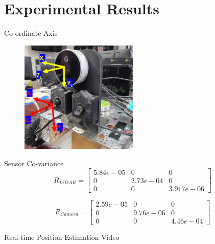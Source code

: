 \documentclass[10pt]{beamer}
\begin{document}


\section{Experimental Results}

\begin{frame}{Co-ordinate Axis}
\begin{figure}
    \centering
    \includegraphics[width=0.5\textwidth]{Images/experimentalplateform.png}
\end{figure}
\end{frame}

\begin{frame}{Sensor Co-variance}
\large
\centering
$$R_{LiDAR} = 
    \left[\begin{array}{ccc}
    5.84e-05 & 0 & 0 \\
    0 & 2.73e-04 & 0 \\
    0 & 0 & 3.917e-06
    \end{array}\right]$$
    
$$  R_{Camera} =
    \left[\begin{array}{ccc}
    2.59e-05 & 0 & 0 \\
    0 & 9.76e-06 & 0 \\
    0 & 0 & 4.46e-04
    \end{array}\right]$$    
\end{frame}

\begin{frame}{Real-time Position Estimation}
\centering
 \huge
 Video
    
\end{frame}
\end{document}
